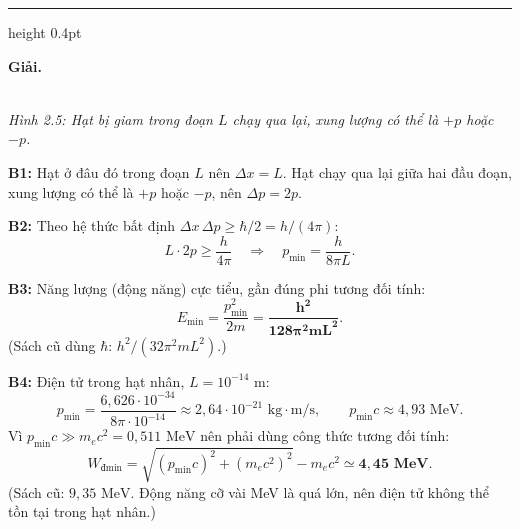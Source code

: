 \documentclass[11pt,a4paper]{article}
\renewcommand{\boldsymbol}[1]{\symbf{#1}}
\let\DeBaiOriginal\DeBai
\renewcommand{\DeBai}[1]{\par\Needspace{5\baselineskip}\DeBaiOriginal{#1}}
\newcommand{\PhanCachBai}{%
  \par\Needspace{7\baselineskip}%
  \addvspace{6pt}%
  {\color{black!40}\hrule height 0.4pt}%
  \nobreak\vspace{7pt}\nobreak
}
\begin{document}
\PhanCachBai


\textbf{Giải.}

\begin{center}\begin{minipage}{\linewidth}\centering
{}\\[0.1cm]
\textit{Hình 2.5: Hạt bị giam trong đoạn $L$ chạy qua lại, xung lượng có thể là $+p$ hoặc $-p$.}
\end{minipage}\end{center}

\textbf{B1:} Hạt ở đâu đó trong đoạn $L$ nên $\Delta x=L$.
Hạt chạy qua lại giữa hai đầu đoạn, xung lượng có thể là $+p$ hoặc $-p$, nên $\Delta p=2p$.

\textbf{B2:} Theo hệ thức bất định $\Delta x\,\Delta p\ge\hbar/2=h/(4\pi)$:
\[
L\cdot2p\ge\frac{h}{4\pi}\quad\Longrightarrow\quad p_{\min}=\frac{h}{8\pi L}.
\]

\textbf{B3:} Năng lượng (động năng) cực tiểu, gần đúng phi tương đối tính:
\[
E_{\min}=\frac{p_{\min}^2}{2m}=\boldsymbol{\frac{h^2}{128\pi^2mL^2}}.
\]
(Sách cũ dùng $\hbar$: $h^2/(32\pi^2mL^2)$.)

\textbf{B4:} Điện tử trong hạt nhân, $L=10^{-14}\text{ m}$:
\[
p_{\min}=\frac{6{,}626\cdot10^{-34}}{8\pi\cdot10^{-14}}\approx2{,}64\cdot10^{-21}\text{ kg}\cdot\text{m/s},
\qquad p_{\min}c\approx4{,}93\text{ MeV}.
\]
Vì $p_{\min}c\gg m_ec^2=0{,}511\text{ MeV}$ nên phải dùng công thức tương đối tính:
\[
W_{\text{đ}\min}=\sqrt{(p_{\min}c)^2+(m_ec^2)^2}-m_ec^2
\simeq\boldsymbol{4{,}45\text{ MeV}}.
\]
(Sách cũ: $9{,}35\text{ MeV}$. Động năng cỡ vài MeV là quá lớn, nên điện tử không thể tồn tại trong hạt nhân.)
\end{document}

